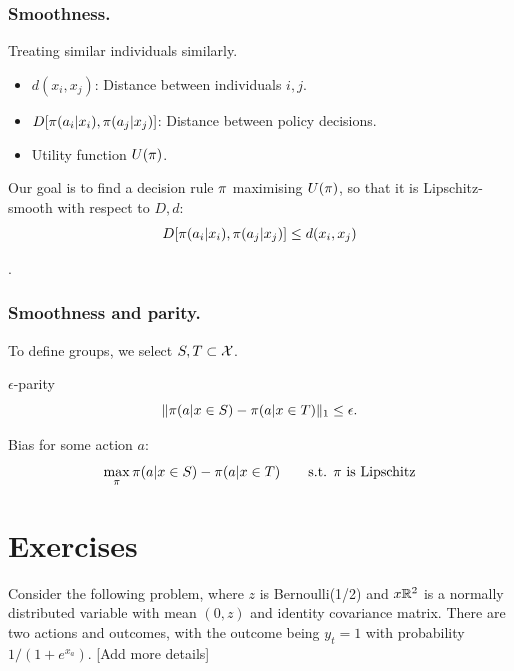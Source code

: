 \begin{frame}\frametitle{Smoothness.}
  \begin{block}{Treating similar individuals similarly.}
    \begin{itemize}
    \item $d(x_i,x_j)$: Distance between individuals $i,j$.
    \item $D[\pi(a_i | x_i), \pi(a_j | x_j)]$: Distance between policy decisions.
    \item Utility function $U(\pi)$.
    \end{itemize}
    Our goal is to find a decision rule $\pi$ maximising  $U(\pi)$, 
    so that it is Lipschitz-smooth with respect to $D, d$:
    \[
      D[\pi(a_i | x_i), \pi(a_j | x_j)] \leq d(x_i,x_j)
    \]
  \end{block}
  .
\end{frame}

\begin{frame}\frametitle{Smoothness and parity.}
  To define groups, we select $S, T \subset {\mathcal{X}}$.
  \begin{definition}{$\epsilon$-parity}
    \[
      \|\pi(a | x \in S) - \pi(a | x \in T)\|_1 \leq \epsilon.
    \]
  \end{definition}

  \begin{definition}{Bias for some action $a$:}
    \[
      \max_\pi \pi(a | x \in S) - \pi(a | x \in T)
      \qquad
      \textrm{s.t. $\pi$ is Lipschitz}
    \]
  \end{definition}
\end{frame}


\section{Exercises}

\begin{exercise}
  Consider the following problem, where $z$ is Bernoulli(1/2) and $x {\mathbb{R}}^2$ is a normally distributed variable with mean $(0,z)$ and identity covariance matrix. There are two actions and outcomes, with the outcome being $y_t = 1$ with probability $1/(1 + e^{x_a})$.
  [Add more details]
\end{exercise}

